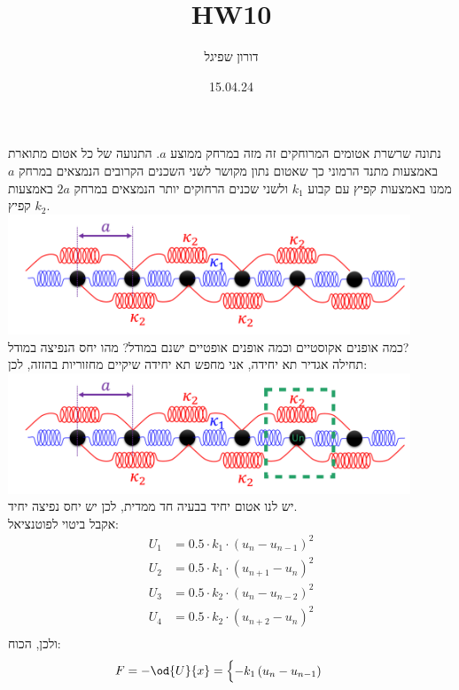 \documentclass{article}
\title{HW10}
\author{דורון שפיגל}
\date{15.04.24}
\begin{document}
\maketitle



\begin{Question}
נתונה שרשרת אטומים המרוחקים זה מזה במרחק ממוצע $a$. התנועה של כל אטום מתוארת באמצעות מתנד הרמוני כך שאטום נתון מקושר לשני השכנים הקרובים הנמצאים במרחק $a$ ממנו באמצעות קפיץ עם קבוע $k_{1}$ ולשני שכנים הרחוקים יותר הנמצאים במרחק $2a$ באמצעות קפיץ $k_{2}$.\\
\includegraphics[width=0.9\textwidth]{Q1.png}\\
כמה אופנים אקוסטיים וכמה אופנים אופטיים ישנם במודל? מהו יחס הנפיצה במודל?\\
תחילה אגדיר תא יחידה, אני מחפש תא יחידה שיקיים מחזוריות בהזזה, לכן:\\
\includegraphics[width=0.9\textwidth]{Q1UnitCell.png}\\
יש לנו אטום יחיד בבעיה חד ממדית, לכן יש יחס נפיצה יחיד.\\
אקבל ביטוי לפוטנציאל:
\begin{align*}
    U_{1}&=0.5\cdot k_{1}\cdot\left( u_{n}-u_{n-1} \right)^{2}\\
    U_{2}&=0.5\cdot k_{1}\cdot\left( u_{n+1}-u_{n} \right)^{2}\\
    U_{3}&=0.5\cdot k_{2}\cdot\left( u_{n}-u_{n-2} \right)^{2}\\
    U_{4}&=0.5\cdot k_{2}\cdot\left( u_{n+2}-u_{n} \right)^{2}\\
\end{align*}
ולכן, הכוח:
\begin{align*}
    F&=-\od{U}{x}=\begin{cases}
        -k_{1}\left( u_{n}-u_{n-1} \right)\\

\end{cases}
\end{align*}
\end{Question}
\end{document}

